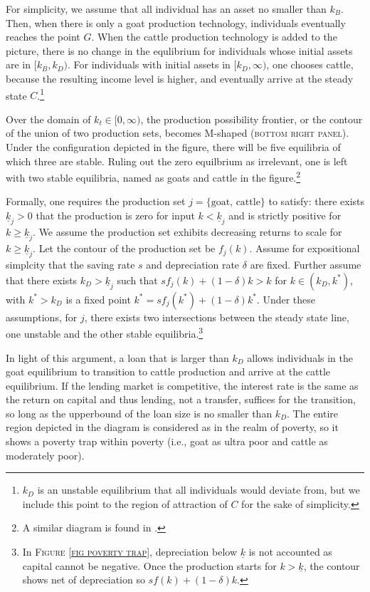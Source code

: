 	For simplicity, we assume that all individual has an asset no smaller than $k_{B}$. Then, when there is only a goat production technology, individuals eventually reaches the point $G$. When the cattle production technology is added to the picture, there is no change in the equlibrium for individuals whose initial assets are in $[k_{B}, k_{D})$. For individuals with initial assets in $[k_{D}, \infty)$, one chooses cattle, because the resulting income level is higher, and eventually arrive at the steady state $C$.\footnote{$k_{D}$ is an unstable equilibrium that all individuals would deviate from, but we include this point to the region of attraction of $C$ for the sake of simplicity. } 

	Over the domain of $k_{t}\in[0, \infty)$, the production possibility frontier, or the contour of the union of two production sets, becomes M-shaped (\textsc{bottom right panel}). Under the configuration depicted in the figure, there will be five equilibria of which three are stable. Ruling out the zero equilbrium as irrelevant, one is left with two stable equilibria, named as goats and cattle in the figure.\footnote{A similar diagram is found in \citet[][Figure 3, with $k-y$ space]{KraayMcKenzie2014}. }

	Formally, one requires the production set $j=\{\mbox{goat, cattle}\}$ to satisfy: there exists $\underline{k}_{j}>0$ that the production is zero for input $k<\underline{k}_{j}$ and is strictly positive for $k\geqslant\underline{k}_{j}$. We assume the production set exhibits decreasing returns to scale for $k\geqslant\underline{k}_{j}$. Let the contour of the production set be $f_{j}(k)$. Assume for expositional simplcity that the saving rate $s$ and depreciation rate $\delta$ are fixed. Further assume that there exists $k_{D}>\underline{k}_{j}$ such that $sf_{j}(k)+(1-\delta)k>k$ for $k\in(k_{D}, k^{*})$, with $k^{*}>k_{D}$ is a fixed point $k^{*}=sf_{j}(k^{*})+(1-\delta)k^{*}$. Under these assumptions, for $j$, there exists two intersections between the steady state line, one unstable and the other stable equilibria.\footnote{In \textsc{Figure \ref{fig poverty trap}}, depreciation below $\underline{k}$ is not accounted as capital cannot be negative. Once the production starts for $k>\underline{k}$, the contour shows net of depreciation so $sf(k)+(1-\delta)k$. } 

	In light of this argument, a loan that is larger than $k_{D}$ allows individuals in the goat equilibrium to transition to cattle production and arrive at the cattle equilibrium. If the lending market is competitive, the interest rate is the same as the return on capital and thus lending, not a transfer, suffices for the transition, so long as the upperbound of the loan size is no smaller than $k_{D}$. The entire region depicted in the diagram is considered as in the realm of poverty, so it shows a poverty trap within poverty (i.e., goat as ultra poor and cattle as moderately poor). 
	
